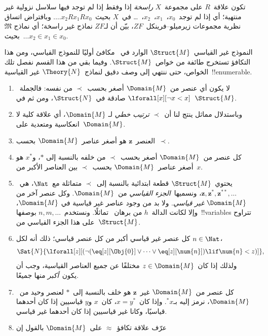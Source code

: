 \documentclass[../../../include/open-logic-section]{subfiles}
\begin{document}
\begin{prob}
تكون علاقة~$R$ على مجموعة~$X$ \emph{راسخة} إذا وفقط إذا لم توجد فيها
سلاسل نزولية غير منتهية؛ أي إذا لم توجد~$x_0$،~$x_1$،~$x_2$،~\dots
في~$X$ بحيث~$\dots x_2Rx_1Rx_0$. وبافتراض اتساق نظرية مجموعات
زيرميلو--فرينكل~$ZF$، بيّن أن لـ$ZF$ نماذج غير راسخة؛ أي نماذج
$\mathfrak{M}$ بحيث~$\dots x_2 \in x_1 \in x_0$.
\end{prob}

النموذج غير القياسي~$\Struct{M}$ الوارد في~ مكافئ
أوليًا للنموذج القياسي، ومن هذا التكافؤ تستخرج طائفة من خواص~$\Struct{M}$.
وفيما بقي من هذا القسم نفصل تلك الخواص، حتى ننتهي إلى وصف دقيق لنماذج~$\Theory{N}$
غير القياسية~!!{enumerable}.

\begin{enumerate}
\item لا يكون أي عنصر من~$\Domain{M}$ أصغر بحسب~$\prec$ من نفسه:
  فالجملة~$\lforall[x][\lnot x < x]$ صادقة في~$\Struct{N}$، ومن ثم
  في~$\Struct{M}$.
\item وباستدلال مماثل ينتج لنا أن~$\prec$ \emph{ترتيب خطي} لـ
  $\Domain{M}$، أي علاقة كلية لا انعكاسية ومتعدية على~$\Domain{M}$.
\item العنصر~$\mathbf{z}$ هو أصغر عناصر~$\Domain{M}$ بحسب~$\prec$.
\item كل عنصر من~$\Domain{M}$ أصغر بحسب~$\prec$ من خلفه بالنسبة إلى
  $*$، و$x^*$ هو أصغر عناصر~$\Domain{M}$ بحسب~$\prec$ بين العناصر
  الأكبر من~$x$.
\item يحتوي~$\Struct{M}$ قطعة ابتدائية بالنسبة إلى~$\prec$ متماثلة
  مع~$\Nat$، هي~$\mathbf{z}, \mathbf{z}^*, \mathbf{z}^{**}, \dots$،
  ونسميها~\emph{الجزء القياسي} من~$\Domain{M}$. وكل عنصر آخر من
  $\Domain{M}$ \emph{غير قياسي}. ولا بد من وجود عناصر غير قياسية في
  $\Domain{M}$، وإلا لكانت الدالة~$h$ من برهان~
  تماثلًا. ونستخدم~$n, m, \dots$ بوصفها~!!{variable}s تتراوح على هذا
  الجزء القياسي من~$\Struct{M}$.
\item كل عنصر غير قياسي أكبر من كل عنصر قياسي؛ ذلك أنه لكل
  $n \in \Nat$،
  \[
  \Sat{N}{\lforall[z][(\lnot(\eq[z][\Obj{0}] \lor
  \dots \lor \eq[z][\num{n}]) \lif \num{n} < z)]},
  \]
  ولذلك إذا كان~$z \in \Domain{M}$ مختلفًا عن جميع العناصر القياسية،
  وجب أن يكون~\emph{أكبر} منها جميعًا.
\item كل عنصر من~$\Domain{M}$ غير~$\mathbf{z}$ هو خلف بالنسبة إلى~$*$
  لعنصر وحيد من~$\Domain{M}$، نرمز إليه بـ$^*x$. وإذا كان~$x = y^*$،
  كان~$x$ و$y$ قياسيين إذا كان أحدهما قياسيًا، وكانا غير قياسيين إذا
  كان أحدهما غير قياسي.
\item عرّف علاقة تكافؤ~$\approx$ على~$\Domain{M}$ بالقول إن

\end{enumerate}
\end{document}
